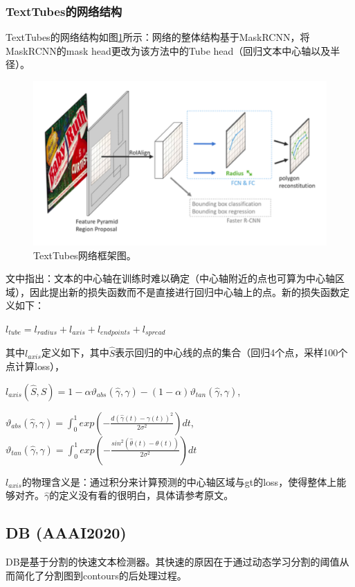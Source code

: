 \subsubsection{TextTubes的网络结构}
TextTubes的网络结构如图\ref{texttubes_framework}所示：网络的整体结构基于MaskRCNN，将MaskRCNN的mask head更改为该方法中的Tube head（回归文本中心轴以及半径）。
\begin{figure}[H]
    \centering
    \includegraphics[width=.8\textwidth]{figure/detection/texttubes_framework.png} 
    \caption{TextTubes网络框架图。} 
    \label{texttubes_framework} 
\end{figure}

文中指出：文本的中心轴在训练时难以确定（中心轴附近的点也可算为中心轴区域），因此提出新的损失函数而不是直接进行回归中心轴上的点。新的损失函数定义如下：

$l_{tube} = l_{radius} + l_{axis} + l_{endpoints} + l_{spread}$

其中$l_{axis}$定义如下，其中$\hat{S}$表示回归的中心线的点的集合（回归4个点，采样100个点计算loss），

$l_{axis}(\hat{S},S) = 1 - \alpha\vartheta_{abs}(\hat{\gamma}, \gamma) - (1 - \alpha)\vartheta_{tan}(\hat{\gamma}, \gamma)$,

$\vartheta_{abs}(\hat{\gamma}, \gamma) = \int_{0}^{1}exp(-\frac{d(\hat{\gamma}(t) - \gamma(t))^{2}}{2\sigma^{2}})dt$, 
$\vartheta_{tan}(\hat{\gamma}, \gamma) = \int_{0}^{1}exp(-\frac{sin^{2}(\hat{\theta}(t) - \theta(t))}{2\sigma^{2}})dt$

$l_{axis}$的物理含义是：通过积分来计算预测的中心轴区域与gt的loss，使得整体上能够对齐。$\hat{\gamma}$的定义没有看的很明白，具体请参考原文。

\subsection{DB (AAAI2020)}
DB\cite{liao2019real}是基于分割的快速文本检测器。其快速的原因在于通过动态学习分割的阈值从而简化了分割图到contours的后处理过程。

